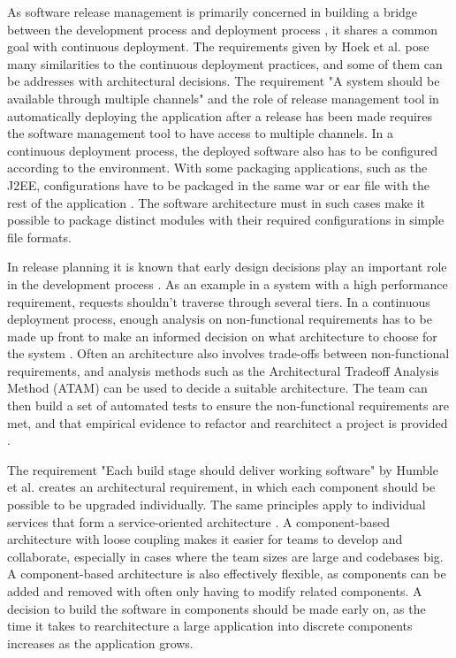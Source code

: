 \documentclass[conference]{IEEEtran}
\begin{document}
As software release management is primarily concerned in building a bridge between the development process and deployment process \cite{van1997software}, it shares a common goal with continuous deployment. The requirements given by Hoek et al. pose many similarities to the continuous deployment practices, and some of them can be addresses with architectural decisions. The requirement "A system should be available through multiple channels" and the role of release management tool in automatically deploying the application after a release has been made requires the software management tool to have access to multiple channels. In a continuous deployment process, the deployed software also has to be configured according to the environment. With some packaging applications, such as the J2EE, configurations have to be packaged in the same war or ear file with the rest of the application \cite{cdbook}. The software architecture must in such cases make it possible to package distinct modules with their required configurations in simple file formats.
 
In release planning it is known that early design decisions play an important role in the development process \cite{lindgren2008importance}. As an example in a system with a high performance requirement, requests shouldn't traverse through several tiers. In a continuous deployment process, enough analysis on non-functional requirements has to be made up front to make an informed decision on what architecture to choose for the system \cite{cdbook}. Often an architecture also involves trade-offs between non-functional requirements, and analysis methods such as the Architectural Tradeoff Analysis Method (ATAM) \cite{kazman1998architecture} can be used to decide a suitable architecture. The team can then build a set of automated tests to ensure the non-functional requirements are met, and that empirical evidence to refactor and rearchitect a project is provided \cite{cdbook}.

The requirement "Each build stage should deliver working software" by Humble et al. \cite{humble2006deployment} creates an architectural requirement, in which each component should be possible to be upgraded individually. The same principles apply to individual services that form a service-oriented architecture \cite{cdbook}. A component-based architecture with loose coupling makes it easier for teams to develop and collaborate, especially in cases where the team sizes are large and codebases big. A component-based architecture is also effectively flexible, as components can be added and removed with often only having to modify related components. A decision to build the software in components should be made early on, as the time it takes to rearchitecture a large application into discrete components increases as the application grows. 
\end{document}
